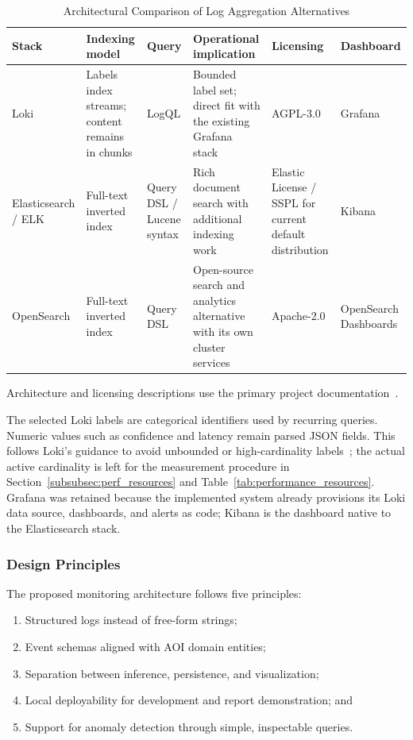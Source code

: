 \documentclass[12pt,a4paper]{article}
\begin{document}
\begin{table}[!ht]
\centering
\scriptsize
\caption{Architectural Comparison of Log Aggregation Alternatives}
\label{tab:log_aggregation}
\begin{tabular}{p{} p{} p{} p{} p{} p{}}
\toprule
\textbf{Stack} & \textbf{Indexing model} & \textbf{Query} & \textbf{Operational implication} & \textbf{Licensing} & \textbf{Dashboard} \\
\midrule
Loki & Labels index streams; content remains in chunks & LogQL & Bounded label set; direct fit with the existing Grafana stack & AGPL-3.0 & Grafana \\
Elasticsearch / ELK & Full-text inverted index & Query DSL / Lucene syntax & Rich document search with additional indexing work & Elastic License / SSPL for current default distribution & Kibana \\
OpenSearch & Full-text inverted index & Query DSL & Open-source search and analytics alternative with its own cluster services & Apache-2.0 & OpenSearch Dashboards \\
\bottomrule
\end{tabular}

\vspace{0.3em}
\raggedright\footnotesize Architecture and licensing descriptions use the primary project documentation~\cite{lokiarch,elasticsearchdocs,opensearchdocs}.
\end{table}

The selected Loki labels are categorical identifiers used by recurring
queries. Numeric values such as confidence and latency remain parsed JSON
fields. This follows Loki's guidance to avoid unbounded or high-cardinality
labels~\cite{lokilabels}; the actual active cardinality is left for the
measurement procedure in Section~\ref{subsubsec:perf_resources} and Table~\ref{tab:performance_resources}.
Grafana was retained because the
implemented system already provisions its Loki data source, dashboards, and
alerts as code; Kibana is the dashboard native to the Elasticsearch stack.

\subsubsection{Design Principles}
The proposed monitoring architecture follows five principles:
\begin{enumerate}
    \item Structured logs instead of free-form strings;
    \item Event schemas aligned with AOI domain entities;
    \item Separation between inference, persistence, and visualization;
    \item Local deployability for development and report demonstration; and
    \item Support for anomaly detection through simple, inspectable queries.
\end{enumerate}
\end{document}
